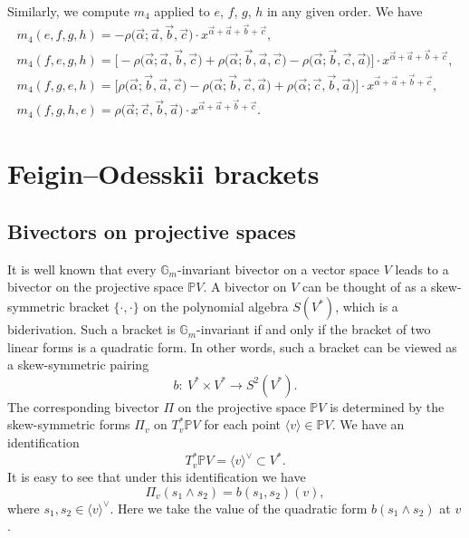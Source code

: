 \documentclass[pdftex]{sigma}
\numberwithin{equation}{section}
\newcommand{\we}{\wedge}
\renewcommand{\P}{{\mathbb P}}
\newcommand{\sub}{\subset}
\renewcommand{\a}{\alpha}
\newcommand{\G}{{\mathbb G}}
\newcommand{\lan}{\langle}
\newcommand{\ran}{\rangle}
\begin{document}
Similarly, we compute $m_4$ applied to $e$, $f$, $g$, $h$ in any given order.
We have
\begin{gather*}
m_4(e,f,g,h)=
-\rho\big(\vec{\a};\vec{a},\vec{b},\vec{c}\big)\cdot x^{\vec{\a}+\vec{a}+\vec{b}+\vec{c}},\\
m_4(f,e,g,h)=\big[-\rho\big(\vec{\a};\vec{a},\vec{b},\vec{c}\big)+\rho\big(\vec{\a};\vec{b},\vec{a},\vec{c}\big)-
\rho\big(\vec{\a};\vec{b},\vec{c},\vec{a}\big)\big]\cdot x^{\vec{\a}+\vec{a}+\vec{b}+\vec{c}},\\
m_4(f,g,e,h)=
\big[\rho\big(\vec{\a};\vec{b},\vec{a},\vec{c}\big)-
\rho\big(\vec{\a};\vec{b},\vec{c},\vec{a}\big)+\rho\big(\vec{\a};\vec{c},\vec{b},\vec{a}\big)\big]\cdot x^{\vec{\a}+\vec{a}+\vec{b}+\vec{c}},\\
m_4(f,g,h,e)=
\rho\big(\vec{\a};\vec{c},\vec{b},\vec{a}\big)\cdot x^{\vec{\a}+\vec{a}+\vec{b}+\vec{c}}.
\end{gather*}

\section{Feigin--Odesskii brackets}

\subsection{Bivectors on projective spaces}

It is well known that every $\G_m$-invariant bivector on a vector space $V$ leads to a bivector on the projective space $\P V$.
A bivector on $V$ can be thought of as a skew-symmetric bracket $\{\cdot,\cdot\}$ on the polynomial algebra $S(V^*)$,
which is a biderivation. Such a bracket is $\G_m$-invariant if and only if the bracket of two linear forms is a quadratic form.
In other words, such a bracket can be viewed as a skew-symmetric pairing
\[
b\colon \ V^*\times V^*\to S^2(V^*).
\]
The corresponding bivector $\Pi$ on the projective space $\P V$ is determined by the skew-symmetric forms
$\Pi_v$ on $T_v^* \P V$ for each point $\lan v\ran \in \P V$. We have an identification
\[
T_v^* \P V=\lan v\ran^\vee \sub V^*.
\]
It is easy to see that under this identification we have
\begin{equation}\label{Pi-b-formula}
\Pi_v(s_1\we s_2)=b(s_1,s_2)(v),
\end{equation}
where $s_1,s_2\in \lan v\ran^\vee$. Here we take the value of the quadratic form $b(s_1\we s_2)$ at $v$.
\end{document}
